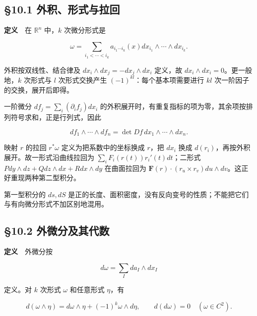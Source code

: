 \documentclass[11pt,a4paper]{article}
\begin{document}
\subsection{§10.1
外积、形式与拉回}\label{ux5916ux79efux5f62ux5f0fux4e0eux62c9ux56de}

\textbf{定义}　在 \(\mathbb R^n\) 中，\(k\) 次微分形式是

\begin{equation*}
 \omega=\sum_{i_1<\cdots<i_k}a_{i_1\cdots i_k}(x)
 dx_{i_1}\wedge\cdots\wedge dx_{i_k}.
\end{equation*}

外积按双线性、结合律及 \(dx_i\wedge dx_j=-dx_j\wedge dx_i\) 定义，故
\(dx_i\wedge dx_i=0\)。更一般地，\(k\) 次形式与 \(l\) 次形式交换产生
\((-1)^{kl}\)：每个基本项需要进行 \(kl\) 次一阶因子的交换，展开后即得。

一阶微分 \(df_j=\sum_i(\partial_i f_j)dx_i\)
的外积展开时，有重复指标的项为零，其余项按排列符号求和，正是行列式，因此

\begin{equation*}
 df_1\wedge\cdots\wedge df_n
 =\det Df\,dx_1\wedge\cdots\wedge dx_n.\tag{10.1}
\end{equation*}

映射 \(r\) 的拉回 \(r^*\omega\) 定义为把系数中的坐标换成 \(r\)，把
\(dx_i\) 换成 \(d(r_i)\)，再按外积展开。故一形式沿曲线拉回为
\(\sum_iF_i(r(t))r_i'(t)dt\)；二形式
\(Pdy\wedge dz+Qdz\wedge dx+Rdx\wedge dy\) 在曲面拉回为
\(\mathbf F(r)\cdot(r_u\times r_v)du\wedge dv\)。这正好重现两种第二型积分。

第一型积分的 \(ds,dS\)
是正的长度、面积密度，没有反向变号的性质；不能把它们与有向微分形式不加区别地混用。

\subsection{§10.2
外微分及其代数}\label{ux5916ux5faeux5206ux53caux5176ux4ee3ux6570}

\textbf{定义}　外微分按

\begin{equation*}
 d\omega=\sum_I da_I\wedge dx_I
\end{equation*}

定义。对 \(k\) 次形式 \(\omega\) 和任意形式 \(\eta\)，有

\begin{equation*}
 d(\omega\wedge\eta)=d\omega\wedge\eta+(-1)^k\omega\wedge d\eta,
 \qquad d(d\omega)=0\quad(\omega\in C^2).\tag{10.2}
\end{equation*}
\end{document}
